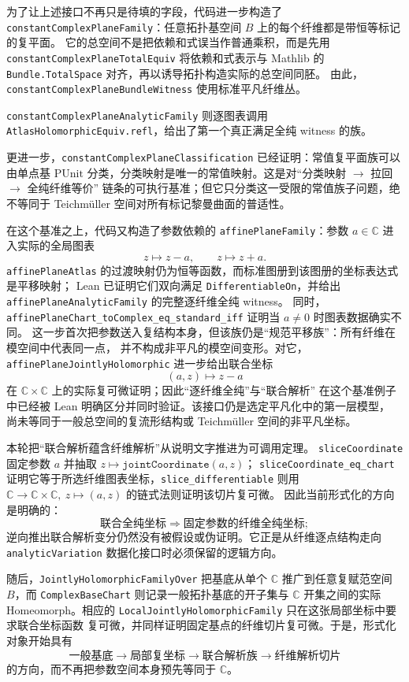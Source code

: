 \documentclass[UTF8,fontset=none,a4paper,11pt]{ctexart}
\begin{document}
为了让上述接口不再只是待填的字段，代码进一步构造了
\texttt{constantComplexPlaneFamily}：任意拓扑基空间 $B$ 上的每个纤维都是带恒等标记的复平面。
它的总空间不是把依赖和式误当作普通乘积，而是先用
\texttt{constantComplexPlaneTotalEquiv} 将依赖和式表示与 Mathlib 的
\texttt{Bundle.TotalSpace} 对齐，再以诱导拓扑构造实际的总空间同胚。
由此，\texttt{constantComplexPlaneBundleWitness} 使用标准平凡纤维丛。

\texttt{constantComplexPlaneAnalyticFamily} 则逐图表调用
\texttt{AtlasHolomorphicEquiv.refl}，给出了第一个真正满足全纯 witness 的族。

更进一步，\texttt{constantComplexPlaneClassification} 已经证明：常值复平面族可以由单点基
$\mathrm{PUnit}$ 分类，分类映射是唯一的常值映射。这是对“分类映射 $\to$ 拉回 $\to$ 全纯纤维等价”
链条的可执行基准；但它只分类这一受限的常值族子问题，绝不等同于 Teichmüller 空间对所有标记黎曼曲面的普适性。

在这个基准之上，代码又构造了参数依赖的
\texttt{affinePlaneFamily}：参数 $a\in\mathbb C$ 进入实际的全局图表
\[
  z\longmapsto z-a,\qquad z\longmapsto z+a.
\]
\texttt{affinePlaneAtlas} 的过渡映射仍为恒等函数，而标准图册到该图册的坐标表达式是平移映射；
Lean 已证明它们双向满足 \texttt{DifferentiableOn}，并给出
\texttt{affinePlaneAnalyticFamily} 的完整逐纤维全纯 witness。
同时，\texttt{affinePlaneChart\_toComplex\_eq\_standard\_iff} 证明当 $a\ne0$ 时图表数据确实不同。
这一步首次把参数送入复结构本身，但该族仍是“规范平移族”：所有纤维在模空间中代表同一点，
并不构成非平凡的模空间变形。对它，
\texttt{affinePlaneJointlyHolomorphic} 进一步给出联合坐标
\[
  (a,z)\longmapsto z-a
\]
在 $\mathbb C\times\mathbb C$ 上的实际复可微证明；因此“逐纤维全纯”与“联合解析”
在这个基准例子中已经被 Lean 明确区分并同时验证。该接口仍是选定平凡化中的第一层模型，
尚未等同于一般总空间的复流形结构或 Teichmüller 空间的非平凡坐标。

本轮把“联合解析蕴含纤维解析”从说明文字推进为可调用定理。
\texttt{sliceCoordinate} 固定参数 \(a\) 并抽取
\(z\mapsto \texttt{jointCoordinate}(a,z)\)；
\texttt{sliceCoordinate\_eq\_chart}
证明它等于所选纤维图表坐标，\texttt{slice\_differentiable} 则用
\(\mathbb C\to\mathbb C\times\mathbb C,\ z\mapsto(a,z)\) 的链式法则证明该切片复可微。
因此当前形式化的方向是明确的：
\[
  \text{联合全纯坐标}
  \Longrightarrow
  \text{固定参数的纤维全纯坐标};
\]
逆向推出联合解析变分仍然没有被假设或伪证明。它正是从纤维逐点结构走向
\texttt{analytic}\allowbreak\texttt{Variation} 数据化接口时必须保留的逻辑方向。

随后，\texttt{JointlyHolomorphicFamilyOver} 把基底从单个 \(\mathbb C\) 推广到任意复赋范空间
\(B\)，而 \texttt{ComplexBaseChart} 则记录一般拓扑基底的开子集与 \(\mathbb C\) 开集之间的实际
Homeomorph。相应的 \texttt{LocalJointlyHolomorphicFamily} 只在这张局部坐标中要求联合坐标函数
复可微，并同样证明固定基点的纤维切片复可微。于是，形式化对象开始具有
\[
  \text{一般基底}
  \longrightarrow
  \text{局部复坐标}
  \longrightarrow
  \text{联合解析族}
  \longrightarrow
  \text{纤维解析切片}
\]
的方向，而不再把参数空间本身预先等同于 \(\mathbb C\)。
\end{document}
